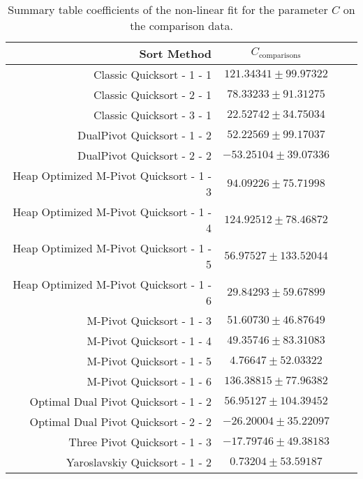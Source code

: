 		\begin{table}
			\begin{center}
				\begin{tabular}{|r|c|c|c}
					\hline
									Sort Method              &   $C_{\text{comparisons}}$      \\ \hline \hline
					                Classic Quicksort - 1 - 1 &  $ 121.34341 \pm  99.97322$ \\ \hline
					                Classic Quicksort - 2 - 1 &  $  78.33233 \pm  91.31275$ \\ \hline
					                Classic Quicksort - 3 - 1 &  $  22.52742 \pm  34.75034$ \\ \hline
					              DualPivot Quicksort - 1 - 2 &  $  52.22569 \pm  99.17037$ \\ \hline
					              DualPivot Quicksort - 2 - 2 &  $ -53.25104 \pm  39.07336$ \\ \hline
					 Heap Optimized M-Pivot Quicksort - 1 - 3 &  $  94.09226 \pm  75.71998$ \\ \hline
					 Heap Optimized M-Pivot Quicksort - 1 - 4 &  $ 124.92512 \pm  78.46872$ \\ \hline
					 Heap Optimized M-Pivot Quicksort - 1 - 5 &  $  56.97527 \pm 133.52044$ \\ \hline
					 Heap Optimized M-Pivot Quicksort - 1 - 6 &  $  29.84293 \pm  59.67899$ \\ \hline
					                M-Pivot Quicksort - 1 - 3 &  $  51.60730 \pm  46.87649$ \\ \hline
					                M-Pivot Quicksort - 1 - 4 &  $  49.35746 \pm  83.31083$ \\ \hline
					                M-Pivot Quicksort - 1 - 5 &  $   4.76647 \pm  52.03322$ \\ \hline
					                M-Pivot Quicksort - 1 - 6 &  $ 136.38815 \pm  77.96382$ \\ \hline
					     Optimal Dual Pivot Quicksort - 1 - 2 &  $  56.95127 \pm 104.39452$ \\ \hline
					     Optimal Dual Pivot Quicksort - 2 - 2 &  $ -26.20004 \pm  35.22097$ \\ \hline
					            Three Pivot Quicksort - 1 - 3 &  $ -17.79746 \pm  49.38183$ \\ \hline
					           Yaroslavskiy Quicksort - 1 - 2 &  $   0.73204 \pm  53.59187$ \\ \hline
				\end{tabular}
				\caption{Summary table coefficients of the non-linear fit for the parameter $C$ on the comparison data.}
				\label{tab:compFitCoeffC}
			\end{center}
		\end{table}



